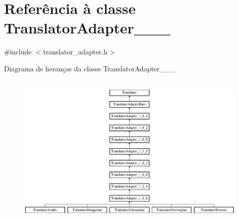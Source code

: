 \hypertarget{class_translator_adapter__1__5__4}{\section{Referência à classe Translator\-Adapter\-\_\-\_\-\_}
\label{class_translator_adapter__1__5__4}
}


{\ttfamily \#include $<$translator\-\_\-adapter.\-h$>$}

Diagrama de heranças da classe Translator\-Adapter\-\_\-\_\-\_\begin{figure}[H]
\begin{center}
\leavevmode
\includegraphics[height=7.512195cm]{class_translator_adapter__1__5__4}
\end{center}
\end{figure}
